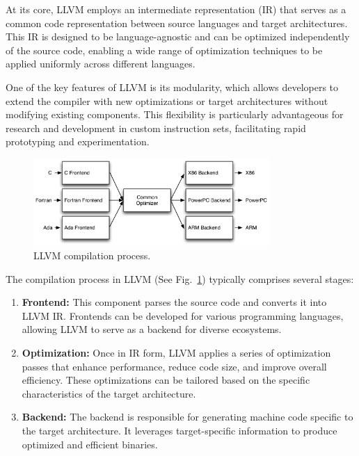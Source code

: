 At its core, LLVM employs an intermediate representation (IR) that serves as a common code representation between source languages and target architectures. This IR is designed to be language-agnostic and can be optimized independently of the source code, enabling a wide range of optimization techniques to be applied uniformly across different languages.

One of the key features of LLVM is its modularity, which allows developers to extend the compiler with new optimizations or target architectures without modifying existing components. This flexibility is particularly advantageous for research and development in custom instruction sets, facilitating rapid prototyping and experimentation.

\begin{figure}
    \centering
    \includegraphics[width=0.8\textwidth]{figures/llvm.png}
    \caption{LLVM compilation process. \cite{llvmfigure}}
    \label{fig:llvm}
\end{figure}

The compilation process in LLVM (See Fig.~\ref{fig:llvm}) typically comprises several stages:

\begin{enumerate}
    \item \textbf{Frontend:} This component parses the source code and converts it into LLVM IR. Frontends can be developed for various programming languages, allowing LLVM to serve as a backend for diverse ecosystems.

    \item \textbf{Optimization:} Once in IR form, LLVM applies a series of optimization passes that enhance performance, reduce code size, and improve overall efficiency. These optimizations can be tailored based on the specific characteristics of the target architecture.

    \item \textbf{Backend:} The backend is responsible for generating machine code specific to the target architecture. It leverages target-specific information to produce optimized and efficient binaries.
\end{enumerate}

